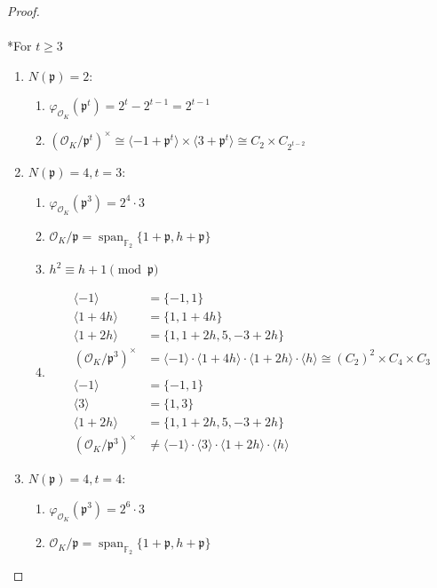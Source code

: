 \documentclass{treatise}
\begin{document}
\begin{shaded}
\begin{proof}
\\
\\
*For $t \geq 3$
\begin{enumerate}
	\item $N(\mathfrak{p}) = 2$: 
	\begin{enumerate}
		\item $\varphi_{\mathcal{O}_K}(\mathfrak{p}^t) = 2^t - 2^{t - 1} = 2^{t - 1}$
		\item $(\mathcal{O}_K / \mathfrak{p}^t)^\times \cong \langle -1 + \mathfrak{p}^t \rangle \times \langle 3 + \mathfrak{p}^t \rangle \cong C_2 \times C_{2^{t - 2}}$
	\end{enumerate}
	\item $N(\mathfrak{p}) = 4, t = 3$:
	\begin{enumerate}
		\item $\varphi_{\mathcal{O}_K}(\mathfrak{p}^3) = 2^4 \cdot 3$
		\item $\mathcal{O}_K / \mathfrak{p} = \operatorname{span}_{\mathbb{F}_2} \{ 1 + \mathfrak{p}, h + \mathfrak{p} \}$
		\item $h^2 \equiv h + 1 \pmod{\mathfrak{p}}$
		\item
		\begin{align*}
		\langle -1 \rangle & = \{ -1, 1 \} \\
		\langle 1 + 4h \rangle & = \{ 1, 1 + 4h \} \\
		\langle 1 + 2h \rangle & = \{ 1, 1 + 2h, 5, -3 + 2h \} \\
		(\mathcal{O}_K / \mathfrak{p}^3)^\times & = \langle -1 \rangle \cdot \langle 1 + 4h \rangle \cdot \langle 1 + 2h \rangle \cdot \langle h \rangle \cong (C_2)^2 \times C_4 \times C_3 \\
		& \\
		\langle -1 \rangle & = \{ -1, 1 \} \\
		\langle 3 \rangle & = \{ 1, 3 \} \\
		\langle 1 + 2h \rangle & = \{ 1, 1 + 2h, 5, -3 + 2h \} \\
		(\mathcal{O}_K / \mathfrak{p}^3)^\times & \neq \langle -1 \rangle \cdot \langle 3 \rangle \cdot \langle 1 + 2h \rangle \cdot \langle h \rangle
		\end{align*}
	\end{enumerate}
	\item $N(\mathfrak{p}) = 4, t = 4$:
	\begin{enumerate}
		\item $\varphi_{\mathcal{O}_K}(\mathfrak{p}^3) = 2^6 \cdot 3$
		\item $\mathcal{O}_K / \mathfrak{p} = \operatorname{span}_{\mathbb{F}_2} \{ 1 + \mathfrak{p}, h + \mathfrak{p} \}$

\end{enumerate}
\end{enumerate}
\end{proof}
\end{shaded}
\end{document}
